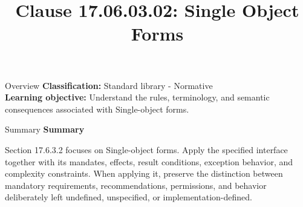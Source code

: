 \documentclass[10pt,letterpaper]{article}
\title{Clause 17.06.03.02: Single Object Forms}
\author{}
\date{}
\begin{document}
\maketitle
\begin{CornellOverviewBox}{Overview}
\textbf{Classification:} Standard library - Normative\\[2pt]
\textbf{Learning objective:} Understand the rules, terminology, and semantic consequences associated with Single-object forms.
\end{CornellOverviewBox}\begin{CornellSummaryBox}{Summary}
{\sffamily\bfseries\color{Accent} Summary}\par\vspace{3pt}Section 17.6.3.2 focuses on Single-object forms. Apply the specified interface together with its mandates, effects, result conditions, exception behavior, and complexity constraints. When applying it, preserve the distinction between mandatory requirements, recommendations, permissions, and behavior deliberately left undefined, unspecified, or implementation-defined.
\end{CornellSummaryBox}
\end{document}
